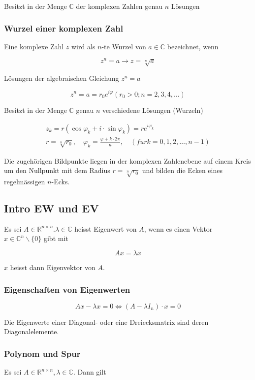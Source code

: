 Besitzt in der Menge $\mathbb{C}$ der komplexen Zahlen genau $n$ Lösungen

\subsubsection*{Wurzel einer komplexen Zahl}
Eine komplexe Zahl $z$ wird als $n$-te Wurzel von $a \in \mathbb{C}$ bezeichnet, wenn

$$
z^{n}=a \rightarrow z=\sqrt[n]{a}
$$

Lösungen der algebraischen Gleichung $z^{n}=a$

$$
z^{n}=a=r_{0} e^{i \varphi}\left(r_{0}>0 ; n=2,3,4, \ldots\right)
$$

Besitzt in der Menge $\mathbb{C}$ genau $n$ verschiedene Lösungen (Wurzeln)

$$
\begin{gathered}
z_{k}=r\left(\cos \varphi_{k}+i \cdot \sin \varphi_{k}\right)=r e^{i \varphi_{k}} \\
r=\sqrt[n]{r_{0}}, \quad \varphi_{k}=\frac{\varphi+k \cdot 2 \pi}{n}, \quad(f \ddot{u} r k=0,1,2, \ldots, n-1)
\end{gathered}
$$

Die zugehörigen Bildpunkte liegen in der komplexen Zahlenebene auf einem Kreis um den Nullpunkt mit dem Radius $r=\sqrt[n]{r_{0}}$ und bilden die Ecken eines regelmässigen $n$-Ecks.


\subsection{Intro EW und EV}

Es sei $A \in \mathbb{R}^{n \times n} . \lambda \in \mathbb{C}$ heisst Eigenwert von $A$, wenn es einen Vektor $x \in \mathbb{C}^{n} \backslash\{0\}$ gibt mit

$$
A x=\lambda x
$$

$x$ heisst dann Eigenvektor von $A$.

\subsubsection*{Eigenschaften von Eigenwerten}
$$
A x-\lambda x=0 \Leftrightarrow\left(A-\lambda I_{n}\right) \cdot x=0
$$

Die Eigenwerte einer Diagonal- oder eine Dreiecksmatrix sind deren Diagonalelemente.

\subsubsection*{Polynom und Spur}
Es sei $A \in \mathbb{R}^{n \times n}, \lambda \in \mathbb{C}$. Dann gilt

